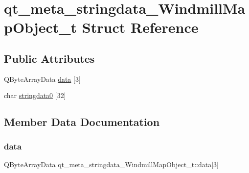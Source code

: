 \hypertarget{structqt__meta__stringdata___windmill_map_object__t}{}\section{qt\+\_\+meta\+\_\+stringdata\+\_\+\+Windmill\+Map\+Object\+\_\+t Struct Reference}
\label{structqt__meta__stringdata___windmill_map_object__t}
\subsection*{Public Attributes}
\begin{DoxyCompactItemize}
\item 
Q\+Byte\+Array\+Data \mbox{\hyperlink{structqt__meta__stringdata___windmill_map_object__t_ab25132cd5eb7aad5fafb0cb173345682}{data}} \mbox{[}3\mbox{]}
\item 
char \mbox{\hyperlink{structqt__meta__stringdata___windmill_map_object__t_ae012ea20feb37fb367cadae4ea5a6826}{stringdata0}} \mbox{[}32\mbox{]}
\end{DoxyCompactItemize}


\subsection{Member Data Documentation}
\mbox{\label{structqt__meta__stringdata___windmill_map_object__t_ab25132cd5eb7aad5fafb0cb173345682}} 
\subsubsection{\texorpdfstring{data}{data}}
{\footnotesize\ttfamily Q\+Byte\+Array\+Data qt\+\_\+meta\+\_\+stringdata\+\_\+\+Windmill\+Map\+Object\+\_\+t\+::data\mbox{[}3\mbox{]}}

\mbox{\label{structqt__meta__stringdata___windmill_map_object__t_ae012ea20feb37fb367cadae4ea5a6826}} 
